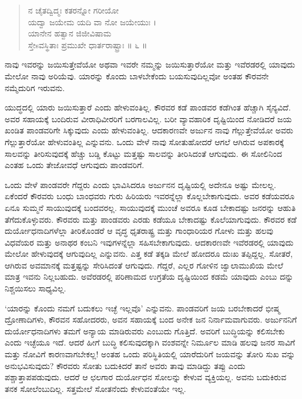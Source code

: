 \begin{verse}
ನ ಚೈತದ್ವಿದ್ಮಃ ಕತರನ್ನೋ ಗರೀಯೋ\\ಯದ್ವಾ ಜಯೇಮ ಯದಿ ವಾ ನೋ ಜಯೇಯುಃ ।\\ಯಾನೇನ ಹತ್ವಾನ ಜಿಜೀವಿಷಾಮ\\ಸ್ತೇsವಸ್ಥಿತಾಃ ಪ್ರಮುಖೇ ಧಾರ್ತರಾಷ್ಟ್ರಾಃ \num{॥ ೬ ॥}
\end{verse}

{\small ನಾವು ಇವರನ್ನು ಜಯಿಸುತ್ತೇವೆಯೋ ಅಥವಾ ಇವರೇ ನಮ್ಮನ್ನು ಜಯಿಸುತ್ತಾರೆಯೋ ಮತ್ತು ಇವೆರಡರಲ್ಲಿ ಯಾವುದು ಮೇಲೋ ನಾವು ಅರಿಯೆವು. ಯಾರನ್ನು ಕೊಂದು ಬಾಳಬೇಕೆಂದು ಬಯಸುವುದಿಲ್ಲವೋ ಅಂತಹ ಕೌರವನೇ ನಮ್ಮೆದುರಿಗ ಇರುವನು.}

ಯುದ್ಧದಲ್ಲಿ ಯಾರು ಜಯಿಸುತ್ತಾರೆ ಎಂದು ಹೇಳುವಂತಿಲ್ಲ. ಕೌರವರ ಕಡೆ ಪಾಂಡವರ ಕಡೆಗಿಂತ ಹೆಚ್ಚಾಗಿ ಸೈನ್ಯವಿದೆ. ಅವರ ಸಹಾಯಕ್ಕೆ ಬಂದಿರುವ ವೀರಾಧಿವೀರರಿಗೆ ಬರಗಾಲವಿಲ್ಲ. ಬರೀ ವ್ಯಾವಹಾರಿಕ ದೃಷ್ಟಿಯಿಂದ ನೋಡಿದರೆ ಜಯ ಖಂಡಿತ ಪಾಂಡವರಿಗೇ ಸಿಕ್ಕುವುದು ಎಂದು ಹೇಳುವಂತಿಲ್ಲ. ಆದಕಾರಣವೇ ಅರ್ಜುನ ನಾವು ಗೆಲ್ಲುತ್ತೇವೆಯೋ ಅವರು ಗೆಲ್ಲುತ್ತಾರೆಯೋ ಹೇಳುವಂತಿಲ್ಲ ಎನ್ನುವನು. ಒಂದು ವೇಳೆ ನಾವು ಸೋತುಹೋದರೆ ಆಗಲೆ ಆಗಿರುವ ಅಪಕಾರಕ್ಕೆ ಸಾಲವನ್ನು ತೀರಿಸುವುದಕ್ಕೆ ಹೆಚ್ಚು ಬಡ್ಡಿ ಕೊಟ್ಟು ಮತ್ತಷ್ಟು ಸಾಲವನ್ನು ತೀರಿಸಿದಂತೆ ಆಗುವುದು. ಈ ಸೋಲಿನಿಂದ ಎಂತಹ ಒಂದು ತೇಜೋವಧೆ ಆಗುವುದು ಪಾಂಡವರಿಗೆ.

ಒಂದು ವೇಳೆ ಪಾಂಡವರೇ ಗೆದ್ದರು ಎಂದು ಭಾವಿಸಿದರೂ ಅರ್ಜುನನ ದೃಷ್ಟಿಯಲ್ಲಿ ಅದೇನೂ ಅಷ್ಟು ಮೇಲಲ್ಲ. ಏಕೆಂದರೆ ಕೌರವರು ಬಂಧು ಬಾಂಧವರು ಗುರು ಹಿರಿಯರು ಇವರನ್ನೆಲ್ಲಾ ಕೊಲ್ಲಬೇಕಾಗುವುದು. ಅವರ ಕಡೆಯವರೂ ಏನೂ ಸುಮ್ಮನೆ ಸಾಯುವುದಕ್ಕೆ ಬಂದವರಲ್ಲ. ಸಾಯುವುದಕ್ಕೆ ಮುಂಚೆ ಅವರೂ ಕೂಡ ಬೇಕಾದಷ್ಟು ಜನರನ್ನು ಆಹುತಿ ತೆಗೆದುಕೊಳ್ಳುವರು. ಕೌರವರು ಮತ್ತು ಪಾಂಡವರು ಎರಡು ಕಡೆಯೂ ಬೇಕಾದಷ್ಟು ಕೊಲೆಯಾಗುವುದು. ಕೌರವರ ಕಡೆ ದುರ್ಯೋಧನಾದಿಗಳೆಲ್ಲಾ ತೀರಿಕೊಂಡರೆ ಆ ವೃದ್ಧ ಧೃತರಾಷ್ಟ್ರ ಮತ್ತು ಗಾಂಧಾರಿಯರ ಗೋಳು ಮತ್ತು ಹಲವು ವಿಧವೆಯರ ಮತ್ತು ಅನಾಥರ ಕಂಬನಿ ಇವುಗಳನ್ನೆಲ್ಲಾ ಸಹಿಸಬೇಕಾಗುವುದು. ಆದಕಾರಣವೇ ಇವೆರಡರಲ್ಲಿ ಯಾವುದು ಮೇಲೋ ಹೇಳುವುದಕ್ಕೆ ಆಗುವುದಿಲ್ಲ ಎನ್ನುವನು. ಎತ್ತ ಕಡೆ ತಕ್ಕಡಿ ಮೇಲೆ ಹೋದರೂ ದುಃಖ ತಪ್ಪಿದ್ದಲ್ಲ. ಸೋತರೆ, ಆಗಿರುವ ಅವಮಾನಕ್ಕೆ ಮತ್ತಷ್ಟನ್ನು ಸೇರಿಸಿದಂತೆ ಆಗುವುದು. ಗೆದ್ದರೆ, ಎಲ್ಲರ ಗೋಳಿನ ಜ್ವಾಲಾಮುಖಿಯ ಮೇಲೆ ಮಾತ್ರ ಇವನು ನಿಲ್ಲಬಹುದು. ಅವೆರಡರಲ್ಲಿ ಪರಿಣಾಮದ ಉಗ್ರತೆಯ ದೃಷ್ಟಿಯಿಂದ ಕಡಮೆ ಯಾವುದು ಎಂಬು ದನ್ನು ನಿಶ್ಚಯಿಸಲು ಸಾಧ್ಯವಿಲ್ಲ.

‘ಯಾರನ್ನು ಕೊಂದು ನಮಗೆ ಬದುಕಲು ಇಚ್ಛೆ ಇಲ್ಲವೊ’ ಎನ್ನುವನು. ಪಾಂಡವರಿಗೆ ಜಯ ಬರಬೇಕಾದರೆ ಭೀಷ್ಮ ದ್ರೋಣಾದಿಗಳು, ಕೌರವನ ಸಹೋದರರು, ಅವನ ಸಹಾಯಕ್ಕೆ ಬಂದ ಅನೇಕ ಜನ ನಿರ್ನಾಮವಾಗುವರು. ಅರ್ಜುನನಿಗೆ ದುರ್ಯೋಧನಾದಿಗಳು ತಮಗೆ ಅನ್ಯಾಯ ಮಾಡಿರುವರು ಎಂಬುದು ಗೊತ್ತಿದೆ. ಅವರಿಗೆ ಬುದ್ಧಿಯನ್ನು ಕಲಿಸಬೇಕು ಎಂದು ಇಚ್ಛೆಯೂ ಇದೆ. ಆದರೆ ಹೀಗೆ ಬುದ್ಧಿ ಕಲಿಸುವುದಕ್ಕಾಗಿ ವಂಶವನ್ನೇ ನಿರ್ಮೂಲ ಮಾಡಿ ಹಲವು ಜನರ ಸಾವಿಗೆ ಮತ್ತು ನೋವಿಗೆ ಕಾರಣವಾಗಬೇಕಲ್ಲ! ಅಂತಹ ಒಂದು ಪರಿಸ್ಥಿತಿಯಲ್ಲಿ ಯಾರೆದುರಿಗೆ ಜಯವನ್ನು ತೋರಿ ಸುಖ ವನ್ನು ಅನುಭವಿಸುವುದು? ಕೌರವರು ಸೋತು ಬದುಕಿದರೆ ತಾನೆ ಅವರು ತಾವು ಮಾಡಿದ್ದು ತಪ್ಪು ಎಂದು ಪಶ್ಚಾತ್ತಾಪಪಡುವುದು. ಆದರೆ ಆ ಛಲಗಾರ ದುರ್ಯೋಧನ ಸೋಲನ್ನು ಕೇಳುವ ವ್ಯಕ್ತಿಯಲ್ಲ. ಅವನು ಬದುಕಿರುವ ತನಕ ಸೋಲೆಂಬುದಿಲ್ಲ. ಸತ್ತಮೇಲೆ ಸೋತನೆಂದು ಕೇಳುವಂತೆಯೇ ಇಲ್ಲ.

